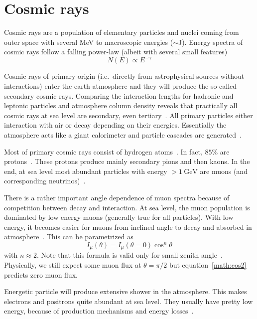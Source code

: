\section{Cosmic rays}\label{sec:theo}
Cosmic rays are a population of elementary particles and nuclei coming from outer space with several \si{\mega\eV} to macroscopic energies ($\sim\si{\joule}$). Energy spectra of cosmic rays follow a falling power-law (albeit with several small features)~\cite{PDG}~\cite{Gaisser}
\begin{equation*}
	N(E) \propto E^{-\gamma}
\end{equation*}

Cosmic rays of primary origin (i.e.~directly from astrophysical sources without interactions) enter the earth atmosphere and they will produce the so-called secondary cosmic rays. Comparing the interaction lengths for hadronic and leptonic particles and atmosphere column density reveals that practically all cosmic rays at sea level are secondary, even tertiary~\cite{grupen}. All primary particles either interaction with air or decay depending on their energies. Essentially the atmosphere acts like a giant calorimeter and particle cascades are generated~\cite{grupen}.

Most of primary cosmic rays consist of hydrogen atoms~\cite{Gaisser}. In fact, $85\%$ are protons~\cite{grupen}. These protons produce mainly secondary pions and then kaons. In the end, at sea level most abundant particles with energy $>\SI{1}{\giga\eV}$ are muons (and corresponding neutrinos)~\cite{PDG}. 

There is a rather important angle dependence of muon spectra because of competition between decay and interaction. At sea level, the muon population is dominated by low energy muons (generally true for all particles). With low energy, it becomes easier for muons from inclined angle to decay and absorbed in atmosphere~\cite{grupen}. This can be parametrized as~\cite{grupen}
\begin{equation}
	I_\mu (\theta) = I_\mu (\theta = 0) \cos^n \theta
	\label{math:cos2}
\end{equation}
with $n\approx 2$. Note that this formula is valid only for small zenith angle~\cite{Shukla}. Physically, we still expect some muon flux at $\theta=\pi/2$ but equation~\ref{math:cos2} predicts zero muon flux.

Energetic particle will produce extensive shower in the atmosphere.	This makes electrons and positrons quite abundant at sea level. They usually have pretty low energy, because of production mechanisms and energy losses~\cite{grupen}.
